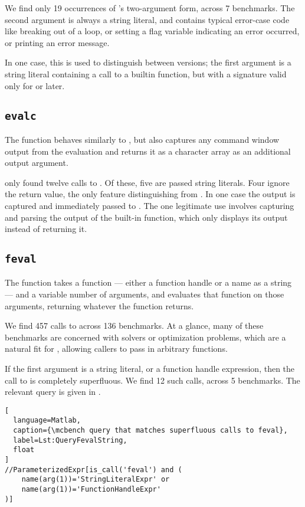 We find only 19 occurrences of 's two-argument form, across 7
benchmarks. The second argument is always a string literal, and contains
typical error-case code like breaking out of a loop, or setting a flag variable
indicating an error occurred, or printing an error message.

In one case, this is used to distinguish between \matlab versions; the first
argument is a string literal containing a call to a builtin function, but with
a signature valid only for  or later.

\subsection{\texttt{evalc}}

The  function behaves similarly to , but also captures
any command window output from the evaluation and returns it as a character
array as an additional output argument.

\mcbench only found twelve calls to . Of these, five are passed
string literals. Four ignore the return value, the only feature distinguishing
 from . In one case the output is captured and
immediately passed to . The one legitimate use involves capturing
and parsing the output of the \matlab built-in  function, which
only displays its output instead of returning it.

\subsection{\texttt{feval}}

The  function takes a function --- either a function handle or a
name as a string --- and a variable number of arguments, and evaluates that
function on those arguments, returning whatever the function returns.

We find 457 calls to  across 136 benchmarks. At a glance, many of
these benchmarks are concerned with solvers or optimization problems, which are
a natural fit for , allowing callers to pass in arbitrary
functions.

If the first argument is a string literal, or a function handle expression,
then the call to  is completely superfluous. We find 12 such calls,
across 5 benchmarks. The relevant query is given in
.

\begin{lstlisting}[
  language=Matlab,
  caption={\mcbench query that matches superfluous calls to feval},
  label=Lst:QueryFevalString,
  float
]
//ParameterizedExpr[is_call('feval') and (
    name(arg(1))='StringLiteralExpr' or
    name(arg(1))='FunctionHandleExpr'
)]
\end{lstlisting}

